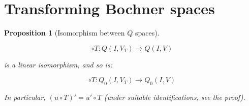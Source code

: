 \documentclass[english,a4paper,10pt,oneside]{scrbook}	%
\theoremstyle{break}
\newtheorem{prop}[equation]{Proposition}
\theoremstyle{remark}
\newcommand{\norm}[1]{\left\lVert#1\right\rVert}
\newcommand{\tr}{\text{tr}}
\newcommand{\tred}[1]{\textcolor{red}{#1}}
\begin{document}
%
%
%
%
%
%
%
%
%
%		
%

\section{Transforming Bochner spaces}

\begin{prop}[Isomorphism between $Q$ spaces]
\label{prop:change_boch}

$$\circ T : Q(I,V_T)\rightarrow Q(I,V)$$

is a linear isomorphism, and so is:

$$\circ T : Q_0(I,V_T)\rightarrow Q_0(I,V)$$

In particular, $(u\circ T)' = u'\circ T$ (under suitable identifications, see the proof).

\end{prop}
\end{document}

